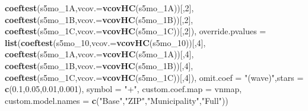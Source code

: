 \documentclass[
]{article}
\newenvironment{Shaded}{\begin{snugshade}}{\end{snugshade}}
\newcommand{\DataTypeTok}[1]{\textcolor[rgb]{0.13,0.29,0.53}{#1}}
\newcommand{\DecValTok}[1]{\textcolor[rgb]{0.00,0.00,0.81}{#1}}
\newcommand{\FloatTok}[1]{\textcolor[rgb]{0.00,0.00,0.81}{#1}}
\newcommand{\KeywordTok}[1]{\textcolor[rgb]{0.13,0.29,0.53}{\textbf{#1}}}
\newcommand{\NormalTok}[1]{#1}
\newcommand{\StringTok}[1]{\textcolor[rgb]{0.31,0.60,0.02}{#1}}
\begin{document}
\begin{Shaded}
\begin{Highlighting}[]
                             \KeywordTok{coeftest}\NormalTok{(s5mo_1A,}\DataTypeTok{vcov.=}\KeywordTok{vcovHC}\NormalTok{(s5mo_1A))[,}\DecValTok{2}\NormalTok{],}
                             \KeywordTok{coeftest}\NormalTok{(s5mo_1B,}\DataTypeTok{vcov.=}\KeywordTok{vcovHC}\NormalTok{(s5mo_1B))[,}\DecValTok{2}\NormalTok{],}
                             \KeywordTok{coeftest}\NormalTok{(s5mo_1C,}\DataTypeTok{vcov.=}\KeywordTok{vcovHC}\NormalTok{(s5mo_1C))[,}\DecValTok{2}\NormalTok{]),}
          \DataTypeTok{override.pvalues =} \KeywordTok{list}\NormalTok{(}\KeywordTok{coeftest}\NormalTok{(s5mo_}\DecValTok{10}\NormalTok{,}\DataTypeTok{vcov.=}\KeywordTok{vcovHC}\NormalTok{(s5mo_}\DecValTok{10}\NormalTok{))[,}\DecValTok{4}\NormalTok{],}
                                  \KeywordTok{coeftest}\NormalTok{(s5mo_1A,}\DataTypeTok{vcov.=}\KeywordTok{vcovHC}\NormalTok{(s5mo_1A))[,}\DecValTok{4}\NormalTok{],}
                                  \KeywordTok{coeftest}\NormalTok{(s5mo_1B,}\DataTypeTok{vcov.=}\KeywordTok{vcovHC}\NormalTok{(s5mo_1B))[,}\DecValTok{4}\NormalTok{],}
                                  \KeywordTok{coeftest}\NormalTok{(s5mo_1C,}\DataTypeTok{vcov.=}\KeywordTok{vcovHC}\NormalTok{(s5mo_1C))[,}\DecValTok{4}\NormalTok{]),}
          \DataTypeTok{omit.coef =} \StringTok{"(wave)"}\NormalTok{,}\DataTypeTok{stars =} \KeywordTok{c}\NormalTok{(}\FloatTok{0.1}\NormalTok{,}\FloatTok{0.05}\NormalTok{,}\FloatTok{0.01}\NormalTok{,}\FloatTok{0.001}\NormalTok{), }\DataTypeTok{symbol =} \StringTok{"+"}\NormalTok{,}
          \DataTypeTok{custom.coef.map =}\NormalTok{ vnmap, }
          \DataTypeTok{custom.model.names =} \KeywordTok{c}\NormalTok{(}\StringTok{"Base"}\NormalTok{,}\StringTok{"ZIP"}\NormalTok{,}\StringTok{"Municipality"}\NormalTok{,}\StringTok{"Full"}\NormalTok{))}
\end{Highlighting}
\end{Shaded}
\end{document}
